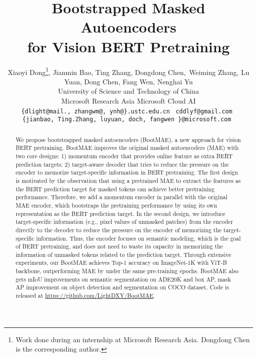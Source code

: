 \documentclass[runningheads]{llncs}
\begin{document}
\pagestyle{headings}
\mainmatter
\def\ECCVSubNumber{1203}  

\title{Bootstrapped Masked Autoencoders\\for Vision BERT Pretraining}

\author{
Xiaoyi Dong\thanks{Work done during an internship at Microsoft Research Asia.  Dongdong Chen is the corresponding author.},  Jianmin Bao, Ting Zhang, Dongdong Chen,\ Weiming Zhang, Lu Yuan, Dong Chen, Fang Wen,  Nenghai Yu  \\
University of Science and Technology of China  \\
Microsoft Research Asia
Microsoft Cloud  AI \\
{\tt\small\{dlight@mail., zhangwm@, ynh@\}.ustc.edu.cn } 
{\tt\small cddlyf@gmail.com }\\
{\tt\small\{jianbao, Ting.Zhang, luyuan, doch, fangwen \}@microsoft.com } 
}
\institute{}
\maketitle

\begin{abstract}
We propose bootstrapped masked autoencoders (BootMAE), a new approach for vision BERT pretraining. BootMAE improves the original masked autoencoders (MAE) with two core designs: 1) momentum encoder that provides online feature as extra BERT prediction targets; 2) target-aware decoder that tries to reduce the pressure on the encoder to memorize target-specific information in BERT pretraining. The first design is motivated by the observation that using a pretrained MAE to extract the features as the BERT prediction target for masked tokens can achieve better pretraining performance. Therefore, we add a momentum encoder in parallel with the original MAE encoder, which bootstraps the pretraining performance by using its own representation as the BERT prediction target. In the second design, we introduce target-specific information (e.g., pixel values of unmasked patches) from the encoder directly to the decoder to reduce the pressure on the encoder of memorizing the target-specific information. Thus, the encoder focuses on semantic modeling, which is the goal of BERT pretraining, and does not need to waste its capacity in memorizing the information of unmasked tokens related to the prediction target. Through extensive experiments, our BootMAE achieves  Top-1 accuracy on ImageNet-1K with ViT-B backbone, outperforming MAE by  under the same pre-training epochs. BootMAE also gets  mIoU improvements on semantic segmentation on ADE20K and  box AP,  mask AP improvement on object detection and segmentation on COCO dataset. Code is released at \url{https://github.com/LightDXY/BootMAE}.

\end{abstract}
\end{document}
